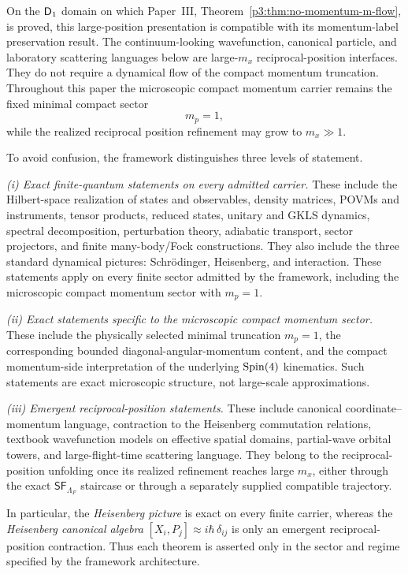 \documentclass[12pt,a4paper]{article}
\begin{document}
\begin{remark}
\label{p4:rem:mp-mx-compatible-with-p3}
On the \(\mathsf{D}_1\) domain on which Paper~III,
Theorem~\ref{p3:thm:no-momentum-m-flow}, is proved, this large-position
presentation is compatible with its momentum-label preservation result.  The
continuum-looking wavefunction, canonical particle, and laboratory scattering
languages below are large-\(m_x\) reciprocal-position interfaces.  They do
not require a dynamical flow of the compact momentum truncation.  Throughout
this paper the microscopic compact momentum carrier remains the fixed minimal
compact sector
\[
        m_p=1,
\]
while the realized reciprocal position refinement may grow to \(m_x\gg1\).
\end{remark}

\begin{remark}
\label{p4:rem:regime-dictionary}
To avoid confusion, the framework distinguishes three levels of statement.

\emph{(i) Exact finite-quantum statements on every admitted carrier.}
These include the Hilbert-space realization of states and observables, density
matrices, POVMs and instruments, tensor products, reduced states, unitary and
GKLS dynamics, spectral decomposition, perturbation theory, adiabatic transport,
sector projectors, and finite many-body/Fock constructions.  They also include
the three standard dynamical pictures: Schr\"odinger, Heisenberg, and
interaction.  These statements apply on every finite sector admitted by the
framework, including the microscopic compact momentum sector with \(m_p=1\).

\emph{(ii) Exact statements specific to the microscopic compact momentum sector.}
These include the physically selected minimal truncation \(m_p=1\), the corresponding bounded diagonal-angular-momentum content, and the compact momentum-side interpretation of the underlying \(\mathrm{Spin}(4)\) kinematics.
Such statements are exact microscopic structure, not large-scale approximations.

\emph{(iii) Emergent reciprocal-position statements.}
These include canonical coordinate--momentum language, contraction to the Heisenberg commutation relations, textbook wavefunction models on effective spatial domains, partial-wave orbital towers, and large-flight-time scattering language.
They belong to the reciprocal-position unfolding once its realized refinement
reaches large \(m_x\), either through the exact
\(\mathsf{SF}_{\Lambda_F}\) staircase or through a separately supplied compatible
trajectory.

In particular, the \emph{Heisenberg picture} is exact on every finite carrier, whereas the \emph{Heisenberg canonical algebra} \([X_i,P_j]\approx i\hbar\,\delta_{ij}\) is only an emergent reciprocal-position contraction.
Thus each theorem is asserted only in the sector and regime specified by the framework architecture.
\end{remark}
\end{document}
